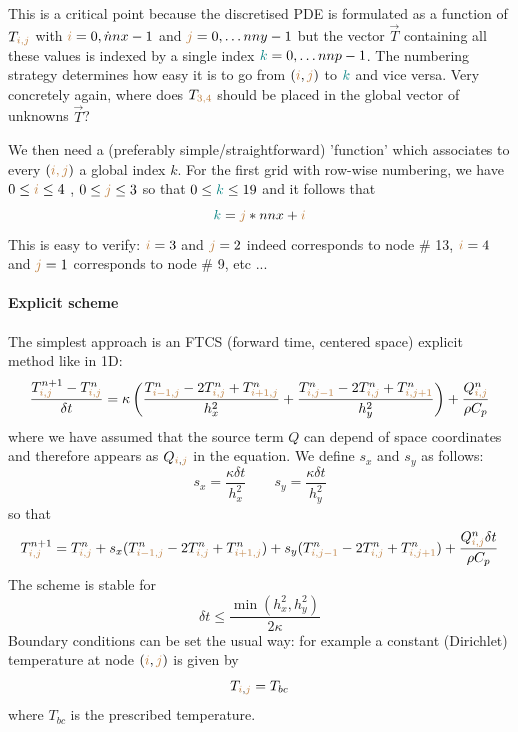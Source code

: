 This is a critical point because the discretised PDE is formulated as a function of $T_{{\color{brown} i,j}}$ 
with ${\color{brown}i}=0,\dot nnx-1$ and ${\color{brown}j}=0,\dots nny-1$ 
but the vector $\vec{T}$ containing all these values
is indexed by a single index ${\color{teal}k}=0,\dots nnp-1$. The numbering strategy determines how easy
it is to go from $({\color{brown}i},{\color{brown}j})$ to ${\color{teal}k}$ and vice versa. 
Very concretely again, where does $T_{\color{brown}3,4}$ should be placed in the global 
vector of unknowns $\vec{T}$?

We then need a (preferably simple/straightforward) 'function' 
which associates to every $({\color{brown} i,j})$ a global index $k$. 
For the first grid with row-wise numbering, we have 
$0\leq {\color{brown}i} \leq 4$ , $0 \leq {\color{brown}j} \leq 3$ 
so that $0 \leq {\color{teal}k} \leq 19$
and it follows that 
\[
{\color{teal} k}={\color{brown}j}*nnx+{\color{brown}i}
\]
This is easy to verify: ${\color{brown}i}=3$ and ${\color{brown}j}=2$ 
indeed corresponds to node \# 13, 
${\color{brown}i}=4$ and ${\color{brown}j}=1$ corresponds to node \# 9, etc ...

\begin{minipage}[t]{\textwidth}
\begin{center}

\end{center}
\end{minipage}





\paragraph{Explicit scheme} The simplest approach is an {\color{olive} FTCS} 
(forward time, centered space) explicit method like in 1D:
\[
\frac{T_{{\color{brown}i,j}}^{n+1}-T_{{\color{brown}i,j}}^n}{\delta t}
= \kappa
\left(
\frac{ T_{{\color{brown}i-1,j}}^{n}-2T_{{\color{brown}i,j}}^{n}+T_{{\color{brown}i+1,j}}^{n}  }{h_x^2} + 
\frac{ T_{{\color{brown}i,j-1}}^{n}-2T_{{\color{brown}i,j}}^{n}+T_{{\color{brown}i,j+1}}^{n}  }{h_y^2}
\right)
+\frac{Q_{{\color{brown}i,j}}^n}{\rho C_p}
\]
where we have assumed that the source term $Q$ can depend of space coordinates and therefore 
appears as $Q_{{\color{brown}i},{\color{brown}j}}$ in the equation.
We define $s_x$ and $s_y$ as follows:
\[
s_x = \frac{\kappa \delta t}{h_x^2}
\quad\quad
s_y = \frac{\kappa \delta t}{h_y^2}
\]
so that
\[
T_{{\color{brown}i,j}}^{n+1} = T_{{\color{brown}i,j}}^n 
+ s_x ( T_{{\color{brown}i-1,j}}^{n}
-2T_{{\color{brown}i,j}}^{n}
+T_{{\color{brown}i+1,j}}^{n} ) 
+s_y ( T_{{\color{brown}i,j-1}}^{n}
-2T_{{\color{brown}i,j}}^{n}
+T_{{\color{brown}i,j+1}}^{n} ) + 
\frac{Q_{{\color{brown}i,j}}^n \delta t}{\rho C_p}
\]
The scheme is stable for  
\[
\delta t \leq \frac{\min(h_x^2,h_y^2)}{2 \kappa}
\]
Boundary conditions can be set the usual way: for example a constant (Dirichlet) temperature 
at node $({\color{brown}i},{\color{brown}j})$ is given by
\[
T_{{\color{brown}i},{\color{brown}j}}=T_{bc} 
\]
where $T_{bc}$ is the prescribed temperature. 


